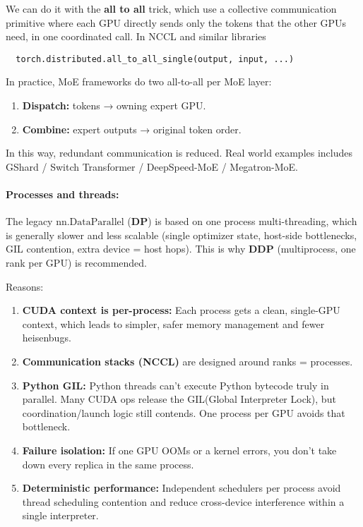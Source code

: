 \documentclass[11pt]{article}  %
\begin{document}
We can do it with the \textbf{all to all} trick, which use a collective communication primitive where each GPU directly sends only the tokens that the other GPUs need, in one coordinated call.
In NCCL and similar libraries
\begin{verbatim}
  torch.distributed.all_to_all_single(output, input, ...)
\end{verbatim}

In practice, MoE frameworks do two all-to-all per MoE layer:
\begin{enumerate}
  \item \textbf{Dispatch:} tokens → owning expert GPU.
  \item \textbf{Combine:} expert outputs → original token order.
\end{enumerate}
In this way, redundant communication is reduced.
Real world examples includes GShard / Switch Transformer / DeepSpeed-MoE / Megatron-MoE.

\paragraph{Processes and threads:} The legacy $\boxed{\text{nn.DataParallel}}$ (\textbf{DP}) is based on one process multi-threading, which is generally slower and less scalable (single optimizer state, host-side bottlenecks, GIL contention, extra device = host hops).
This is why \textbf{DDP} (multiprocess, one rank per GPU) is recommended.

Reasons:
\begin{enumerate}
  \item \textbf{CUDA context is per-process:} Each process gets a clean, single-GPU context, which leads to simpler, safer memory management and fewer heisenbugs.
  \item \textbf{Communication stacks (NCCL)} are designed around ranks = processes.
  \item \textbf{Python GIL:} Python threads can't execute Python bytecode truly in parallel. Many CUDA ops release the GIL(Global Interpreter Lock), but coordination/launch logic still contends. One process per GPU avoids that bottleneck.
  \item \textbf{Failure isolation:}  If one GPU OOMs or a kernel errors, you don't take down every replica in the same process.
  \item \textbf{Deterministic performance:} Independent schedulers per process avoid thread scheduling contention and reduce cross-device interference within a single interpreter.
\end{enumerate}
\end{document}
